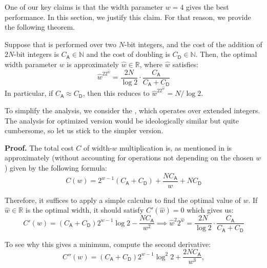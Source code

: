 \documentclass{iacrtrans}
\begin{document}
One of our key claims is that the width parameter $w=4$ gives the best performance. In this section, we justify this claim. For that reason, we provide the following theorem.

\begin{theorem}
    Suppose that  is performed over two $N$-bit integers, and the cost of the addition of $2N$-bit integers is $C_{\mathsf{A}} \in \mathbb{N}$ and the cost of doubling is $C_{\mathsf{D}} \in \mathbb{N}$. Then, the optimal width parameter $w$ is approximately $\hat{w} \in \mathbb{R}$, where $\hat{w}$ satisfies:
    \begin{equation}
        \hat{w}^22^{\hat{w}} = \frac{2N}{\log 2} \cdot \frac{C_{\mathsf{A}}}{C_{\mathsf{A}} + C_{\mathsf{D}}}
    \end{equation}
    In particular, if $C_{\mathsf{A}} \approx C_{\mathsf{D}}$, then this reduces to $\hat{w}^22^{\hat{w}} = N/\log 2$.
\end{theorem}

\begin{remark}
    To simplify the analysis, we consider the , which operates over extended integers. The analysis for optimized version  would be ideologically similar but quite cumbersome, so let us stick to the simpler version.
\end{remark}

\textbf{Proof.} The total cost $C$ of width-$w$ multiplication is, as mentioned in  is approximately (without accounting for operations not depending on the chosen $w$) given by the following formula:
\begin{equation}
    C(w) = 2^{w-1}(C_{\mathsf{A}} + C_{\mathsf{D}}) + \frac{NC_{\mathsf{A}}}{w} + NC_{\mathsf{D}}
\end{equation}

Therefore, it suffices to apply a simple calculus to find the optimal value of $w$. If $\hat{w} \in \mathbb{R}$ is the optimal width, it should satisfy $C'(\hat{w}) = 0$ which gives us:
\begin{equation}
    C'(w) = (C_{\mathsf{A}}+C_{\mathsf{D}})2^{w-1}\log 2 - \frac{NC_{\mathsf{A}}}{w^2} \implies \hat{w}^2 2^{\hat{w}} = \frac{2N}{\log 2}\cdot\frac{C_{\mathsf{A}}}{C_{\mathsf{A}}+C_{\mathsf{D}}}
\end{equation}

To see why this gives a minimum, compute the second derivative:
\begin{equation}
    C''(w) = (C_{\mathsf{A}}+C_{\mathsf{D}})2^{w-1}\log^2 2 + \frac{2NC_{\mathsf{A}}}{w^3},
\end{equation}
\end{document}
